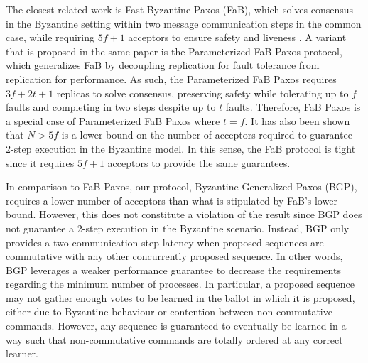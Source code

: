 The closest related work is Fast Byzantine Paxos (FaB), which solves consensus in the Byzantine setting within two message communication steps in the common case, while requiring $5f+1$ acceptors to ensure safety and liveness \cite{Martin2006}. A variant that is proposed in the same paper is the Parameterized FaB Paxos protocol, which generalizes FaB by decoupling replication for fault tolerance from replication for performance. As such, the Parameterized FaB Paxos requires $3f+2t+1$ replicas to solve consensus, preserving safety while tolerating up to $f$ faults and completing in two steps despite up to $t$ faults. Therefore, FaB Paxos is a special case of Parameterized FaB Paxos where $t=f$. It has also been shown that $N>5f$ is a lower bound on the number of acceptors required to guarantee 2-step execution in the Byzantine model. In this sense, the FaB protocol is tight since it requires $5f+1$ acceptors to provide the same guarantees.\par
In comparison to FaB Paxos, our protocol, Byzantine Generalized Paxos (BGP), requires a lower number of acceptors than what is stipulated by FaB's lower bound. However, this does not constitute a violation of the result since BGP does not guarantee a 2-step execution in the Byzantine scenario. Instead, BGP only provides a two communication step latency when proposed sequences are commutative with any other concurrently proposed sequence. In other words, BGP leverages a weaker performance guarantee to decrease the requirements regarding the minimum number of processes. In particular, a proposed sequence may not gather enough votes to be learned in the ballot in which it is proposed, either due to Byzantine behaviour or contention between non-commutative commands. However, any sequence is guaranteed to eventually be learned in a way such that non-commutative commands are totally ordered at any correct learner.
\raggedbottom